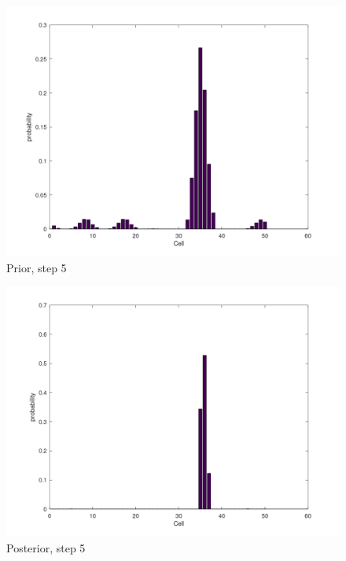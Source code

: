 \documentclass[11pt]{article}
\begin{document}
        \begin{figure}[H]
            \centering
            \includegraphics[width=1.0\textwidth]{../images/prior5v2}
            \caption{Prior, step 5}
            \label{fig:prior5}
        \end{figure}
        \begin{figure}[H]
            \centering
            \includegraphics[width=1.0\textwidth]{../images/posterior5v2}
            \caption{Posterior, step 5}
            \label{fig:post5}
        \end{figure}

    \clearpage
    \printbibliography

    \clearpage
    \listoffigures
\end{document}

